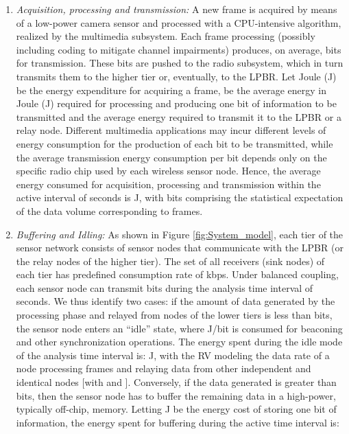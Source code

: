 \documentclass[twocolumn,english]{IEEEtran}
\theoremstyle{plain}
\theoremstyle{definition}
\begin{document}
\begin{enumerate}[leftmargin=*]
\item

\textit{Acquisition, processing and transmission: }A new frame is
acquired by means of a low-power camera sensor and processed with
a CPU-intensive algorithm, realized by the multimedia subsystem. Each
frame processing (possibly including coding to mitigate channel impairments)
produces, on average,  bits for transmission. These bits are pushed
to the radio subsystem, which in turn transmits them to the higher
tier or, eventually, to the LPBR. Let  Joule (J) be the energy
expenditure for acquiring a frame,  be the average energy in Joule
(J) required for processing and producing one bit of information to
be transmitted and  the average energy required to transmit it
to the LPBR or a relay node. Different multimedia applications may
incur different levels of energy consumption for the production of
each bit to be transmitted, while the average transmission energy
consumption per bit depends only on the specific radio chip used by
each wireless sensor node. Hence, the average energy consumed for
acquisition, processing and transmission within the active interval
of  seconds is 
J, with  bits comprising
the statistical expectation of the data volume corresponding to 
frames.

\item

\textit{Buffering and Idling:} As shown in Figure \ref{fig:System_model},
each tier of the sensor network consists of  sensor nodes that
communicate with the LPBR (or the relay nodes of the higher tier).
The set of all receivers (sink nodes) of each tier has predefined
consumption rate of  kbps. Under balanced coupling,
each sensor node can transmit  bits during the analysis
time interval of  seconds. We thus identify two cases: if the
amount of data generated by the processing phase and relayed from
 nodes of the lower tiers is less than  bits, the
sensor node enters an ``idle'' state, where  J/bit is consumed
for beaconing and other synchronization operations. The energy spent
during the idle mode of the analysis time interval is: 
J, with  the RV modeling
the data rate of a node processing  frames and relaying data from
 other independent and identical nodes {[}with 
and {]}. Conversely, if the data
generated is greater than  bits, then the sensor node
has to buffer the remaining data in a high-power, typically off-chip,
memory. Letting  J be the energy cost of storing one bit of information,
the energy spent for buffering during the active time interval is:


\end{enumerate}
\end{document}
